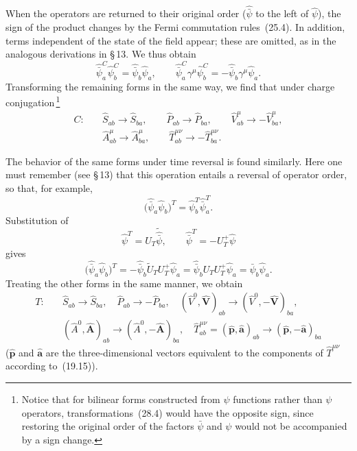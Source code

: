 When the operators are returned to their original order ($\widehat{\bar\psi}$ to the left of $\widehat\psi$), the sign of the product changes by the Fermi commutation rules~(25.4). In addition, terms independent of the state of the field appear; these are omitted, as in the analogous derivations in \S\,13. We thus obtain
\[
\widehat{\bar\psi}^C_a\widehat\psi^C_b = \widehat{\bar\psi}_b\widehat\psi_a,\qquad \widehat{\bar\psi}^C_a\gamma^\mu\widehat\psi^C_b = -\widehat{\bar\psi}_b\gamma^\mu\widehat\psi_a.
\]
Transforming the remaining forms in the same way, we find that under charge conjugation\,\footnote{Notice that for bilinear forms constructed from $\psi$ functions rather than $\psi$ operators, transformations~(28.4) would have the opposite sign, since restoring the original order of the factors $\bar\psi$ and $\psi$ would not be accompanied by a sign change.}
\begin{equation}
\begin{aligned}
C:\quad &\widehat S_{ab} \to \widehat S_{ba},\qquad \widehat P_{ab} \to \widehat P_{ba},\qquad \widehat V^\mu_{ab} \to -\widehat V^\mu_{ba},\\
&\widehat A^\mu_{ab} \to \widehat A^\mu_{ba},\qquad \widehat T^{\mu\nu}_{ab} \to -\widehat T^{\mu\nu}_{ba}.
\end{aligned}
\tag{28.4}
\end{equation}

The behavior of the same forms under time reversal is found similarly. Here one must remember (see \S\,13) that this operation entails a reversal of operator order, so that, for example,
\[
\bigl(\widehat{\bar\psi}_a\widehat\psi_b\bigr)^T = \widehat\psi^T_b\widehat{\bar\psi}^T_a.
\]
Substitution of
\begin{equation}
\widehat\psi^T = U_T\widetilde{\widehat{\bar\psi}},\qquad \widehat{\bar\psi}^T = -U_T^+\widehat\psi
\tag{28.5}
\end{equation}
gives
\[
\bigl(\widehat{\bar\psi}_a\widehat\psi_b\bigr)^T = -\widehat{\bar\psi}_b\widetilde U_TU_T^+\widehat\psi_a = \widehat{\bar\psi}_bU_TU_T^+\widehat\psi_a = \widehat{\bar\psi}_b\widehat\psi_a.
\]
Treating the other forms in the same manner, we obtain
\begin{equation}
\begin{aligned}
T:\quad &\widehat S_{ab} \to \widehat S_{ba},\quad \widehat P_{ab} \to -\widehat P_{ba},\quad (\widehat V^0,\widehat{\mathbf{V}})_{ab} \to (\widehat V^0,-\widehat{\mathbf{V}})_{ba},\\
&(\widehat A^0,\widehat{\mathbf{A}})_{ab} \to (\widehat A^0,-\widehat{\mathbf{A}})_{ba},\quad \widehat T^{\mu\nu}_{ab} = (\widehat{\mathbf{p}},\widehat{\mathbf{a}})_{ab} \to (\widehat{\mathbf{p}},-\widehat{\mathbf{a}})_{ba}
\end{aligned}
\tag{28.6}
\end{equation}
($\widehat{\mathbf{p}}$ and $\widehat{\mathbf{a}}$ are the three-dimensional vectors equivalent to the components of $\widehat T^{\mu\nu}$ according to~(19.15)).

